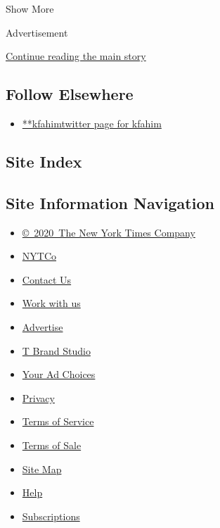 Show More

Advertisement

\protect\hyperlink{after-mid2}{Continue reading the main story}

\hypertarget{follow-elsewhere}{%
\subsection{Follow Elsewhere}\label{follow-elsewhere}}

\begin{itemize}
\tightlist
\item
  \href{https://twitter.com/kfahim}{**kfahimtwitter page for kfahim}
\end{itemize}

\hypertarget{site-index}{%
\subsection{Site Index}\label{site-index}}

\hypertarget{site-information-navigation}{%
\subsection{Site Information
Navigation}\label{site-information-navigation}}

\begin{itemize}
\tightlist
\item
  \href{https://help.nytimes3xbfgragh.onion/hc/en-us/articles/115014792127-Copyright-notice}{©~2020~The
  New York Times Company}
\end{itemize}

\begin{itemize}
\tightlist
\item
  \href{https://www.nytco.com/}{NYTCo}
\item
  \href{https://help.nytimes3xbfgragh.onion/hc/en-us/articles/115015385887-Contact-Us}{Contact
  Us}
\item
  \href{https://www.nytco.com/careers/}{Work with us}
\item
  \href{https://nytmediakit.com/}{Advertise}
\item
  \href{http://www.tbrandstudio.com/}{T Brand Studio}
\item
  \href{https://www.nytimes3xbfgragh.onion/privacy/cookie-policy\#how-do-i-manage-trackers}{Your
  Ad Choices}
\item
  \href{https://www.nytimes3xbfgragh.onion/privacy}{Privacy}
\item
  \href{https://help.nytimes3xbfgragh.onion/hc/en-us/articles/115014893428-Terms-of-service}{Terms
  of Service}
\item
  \href{https://help.nytimes3xbfgragh.onion/hc/en-us/articles/115014893968-Terms-of-sale}{Terms
  of Sale}
\item
  \href{https://spiderbites.nytimes3xbfgragh.onion}{Site Map}
\item
  \href{https://help.nytimes3xbfgragh.onion/hc/en-us}{Help}
\item
  \href{https://www.nytimes3xbfgragh.onion/subscription?campaignId=37WXW}{Subscriptions}
\end{itemize}
